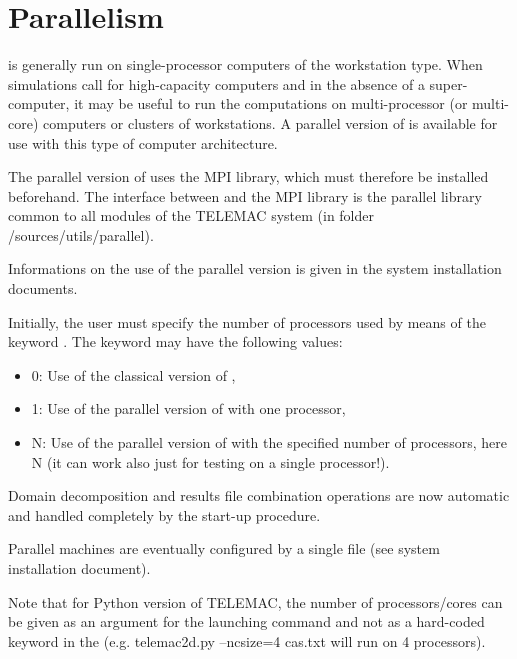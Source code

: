 \chapter{Parallelism}
\label{ch:paral}
 is generally run on single-processor computers of the workstation
type.
When simulations call for high-capacity computers and in the absence of a
super-computer, it may be useful to run the computations on multi-processor
(or multi-core) computers or clusters of workstations.
A parallel version of  is available for use with this type of
computer architecture.

The parallel version of  uses the MPI library, which must therefore
be installed beforehand.
The interface between  and the MPI library is the parallel library
common to all modules of the TELEMAC system (in folder /sources/utils/parallel).

Informations on the use of the parallel version is given in the system
installation documents.

Initially, the user must specify the number of processors used by means of the
keyword .
The keyword may have the following values:

\begin{itemize}
\item 0: Use of the classical version of ,

\item 1: Use of the parallel version of  with one processor,

\item N: Use of the parallel version of  with the specified number
of processors, here N (it can work also just for testing on a single processor!).
\end{itemize}

Domain decomposition and results file combination operations are now automatic
and handled completely by the start-up procedure.

Parallel machines are eventually configured by a single file (see system
installation document).

Note that for Python version of TELEMAC, the number of processors/cores can be
given as an argument for the launching command and not as a hard-coded keyword
in the 
(e.g. telemac2d.py --ncsize=4 cas.txt will run  on 4 processors).
